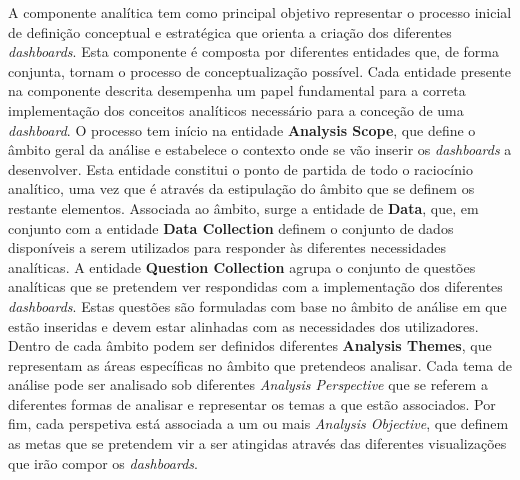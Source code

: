 A componente analítica tem como principal objetivo representar o processo inicial de definição conceptual e estratégica que orienta a criação dos diferentes \textit{dashboards}. Esta componente é composta por diferentes entidades que, de forma conjunta, tornam o processo de conceptualização possível. Cada entidade presente na componente descrita desempenha um papel fundamental para a correta implementação dos conceitos analíticos necessário para a conceção de uma \textit{dashboard}. O processo tem início na entidade \textbf{Analysis Scope}, que define o âmbito geral da análise e estabelece o contexto onde se vão inserir os \textit{dashboards} a desenvolver. Esta entidade constitui o ponto de partida de todo o raciocínio analítico, uma vez que é através da estipulação do âmbito que se definem os restante elementos. Associada ao âmbito, surge a entidade de \textbf{Data}, que, em conjunto com a entidade \textbf{Data Collection} definem o conjunto de dados disponíveis a serem utilizados para responder às diferentes necessidades analíticas. A entidade \textbf{Question Collection} agrupa o conjunto de questões analíticas que se pretendem ver respondidas com a implementação dos diferentes \textit{dashboards}. Estas questões são formuladas com base no âmbito de análise em que estão inseridas e devem estar alinhadas com as necessidades dos utilizadores. Dentro de cada âmbito podem ser definidos diferentes \textbf{Analysis Themes}, que representam as áreas específicas no âmbito que pretendeos analisar. Cada tema de análise pode ser analisado sob diferentes \textit{Analysis Perspective} que se referem a diferentes formas de analisar e representar os temas a que estão associados. Por fim, cada perspetiva está associada a um ou mais \textit{Analysis Objective}, que definem as metas que se pretendem vir a ser atingidas através das diferentes visualizações que irão compor os \textit{dashboards}.

